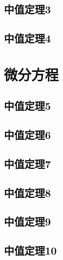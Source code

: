 \documentclass[no-math]{lecture}
\begin{document}
	\section{中值定理3}
	\section{中值定理4}
\newpage
	\chapter{微分方程}
	\section{中值定理5}
	\section{中值定理6}
	\section{中值定理7}
	\section{中值定理8}
	\section{中值定理9}
	\section{中值定理10}
\end{document}
